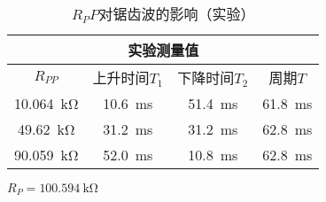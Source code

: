 \documentclass[UTF8]{ctexart}
\numberwithin{figure}{subsection}
\numberwithin{table}{subsection}
\numberwithin{equation}{subsection}
\begin{document}
\begin{table}[h]
    \begin{center}
        \caption{\(R_PP\)对锯齿波的影响（实验）}
        \begin{tabular}{|c|c|c|c|}
            \hline
            \multicolumn{4}{|c|}{实验测量值} \\
            \hline
            \(R_{PP}\)  & 上升时间\(T_1\) & 下降时间\(T_2\) & 周期\(T\)\\
            \hline
            \SI{10.064}{\kilo\ohm} & \SI{10.6}{\milli\second} & \SI{51.4}{\milli\second} & \SI{61.8}{\milli\second} \\
            \hline
            \SI{49.62}{\kilo\ohm} & \SI{31.2}{\milli\second} & \SI{31.2}{\milli\second} & \SI{62.8}{\milli\second} \\
            \hline
            \SI{90.059}{\kilo\ohm} & \SI{52.0}{\milli\second} & \SI{10.8}{\milli\second} & \SI{62.8}{\milli\second} \\
            \hline
            
        \end{tabular}
        \par \(R_P = \SI{100.594}{\kilo\ohm}\)
    \end{center}
\end{table}
\end{document}

